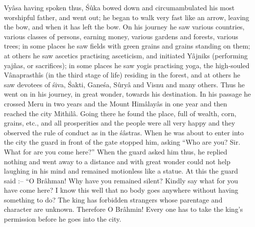 Vy\^asa having spoken thus, \'S\^uka bowed down and circumambulated his most worshipful father, and went out; he began to walk very fast like an arrow, leaving the bow, and when it has left the bow. On his journey he saw various countries, various classes of persons, earning money, various gardens and forests, various trees; in some places he saw fields with green grains and grains standing on them; at others he saw ascetics practising asceticism, and initiated Y\^ajniks (performing yajñas, or sacrifices); in some places he saw yogis practising yoga, the high-souled V\^anaprasth\^is (in the third stage of life) residing in the forest, and at others he saw devotees of \'siva, \'Sakti, Gane\'sa, S\^ury\^a and Visnu and many others. Thus he went on in his journey, in great wonder, towards his destination. In his passage he crossed Meru in two years and the Mount Him\^alay\^as in one year and then reached the city Mithil\^a. Going there he found the place, full of wealth, corn, grains, etc., and all prosperities and the people were all very happy and they observed the rule of conduct as in the \'s\^astras. When he was about to enter into the city the guard in front of the gate stopped him, asking ``Who are you? Sir. What for are you come here?'' When the guard asked him thus, he replied nothing and went away to a distance and with great wonder could not help laughing in his mind and remained motionless like a statue. At this the guard said :-- ``O Br\^ahman! Why have you remained silent? Kindly say what for you have come here? I know this well that no body goes anywhere without having something to do? The king has forbidden strangers whose parentage and character are unknown. Therefore O Br\^ahmin! Every one has to take the king's permission before he goes into the city.

